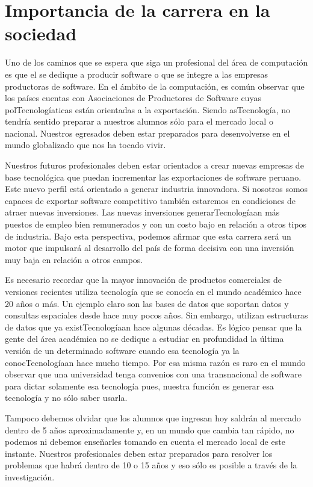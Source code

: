 \section{Importancia de la carrera en la sociedad}\label{sec:cs-importancia-en-la-sociedad}
Uno de los caminos que se espera que siga un profesional del área de computación es que el se dedique a producir software o que se integre a las empresas productoras de software. En el ámbito de la computación, es común observar que los países cuentas con Asociaciones de Productores de Software cuyas polTecnologíaticas están orientadas a la exportación. Siendo asTecnología, no tendría sentido preparar a nuestros alumnos sólo para el mercado local o nacional. Nuestros egresados deben estar preparados para desenvolverse en el mundo globalizado que nos ha tocado vivir.

Nuestros futuros profesionales deben estar orientados a crear nuevas empresas de base tecnológica que puedan incrementar las exportaciones de software peruano. Este nuevo perfil está orientado a generar industria innovadora. Si nosotros somos capaces de exportar software competitivo también estaremos en condiciones de atraer nuevas inversiones. Las nuevas inversiones generarTecnologíaan más puestos de empleo bien remunerados y con un costo bajo en relación a otros tipos de industria. Bajo esta perspectiva, podemos afirmar que esta carrera será un motor que impulsará al desarrollo del país de forma decisiva con una inversión muy baja en relación a otros campos.

Es necesario recordar que la mayor innovación de productos comerciales de versiones recientes utiliza tecnología que se conocía en el mundo académico hace 20 años o más. Un ejemplo claro son las bases de datos que soportan datos y consultas espaciales desde hace muy pocos años. Sin embargo, utilizan estructuras de datos que ya existTecnologíaan hace algunas décadas. Es lógico pensar que la gente del área académica no se dedique a estudiar en profundidad la última versión de un determinado software cuando esa tecnología ya la conocTecnologíaan hace mucho tiempo. Por esa misma razón es raro en el mundo observar que una universidad tenga convenios con una transnacional de software para dictar solamente esa tecnología pues, nuestra función es generar esa tecnología y no sólo saber usarla.

Tampoco debemos olvidar que los alumnos que ingresan hoy saldrán al mercado dentro de 5 años aproximadamente y, en un mundo que cambia tan rápido, no podemos ni debemos enseñarles tomando en cuenta el mercado local de este instante. Nuestros profesionales deben estar preparados para resolver los problemas que habrá dentro de 10 o 15 años y eso sólo es posible a través de la investigación.

